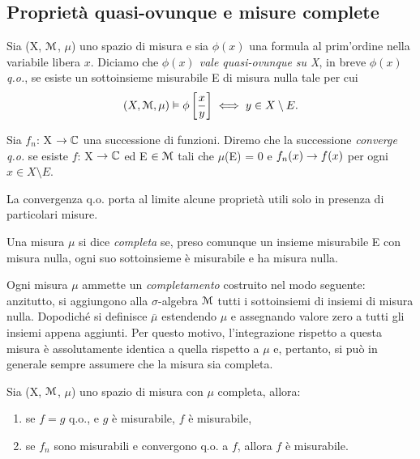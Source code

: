 \documentclass[Completo.tex]{subfiles}
\begin{document}
\subsection{Proprietà quasi-ovunque e misure complete}
Sia (X, $\eu[M]$, $\mu$) uno spazio di misura e sia $\phi(x)$ una formula al prim'ordine nella variabile libera $x$. Diciamo che \textit{$\phi(x)$ vale quasi-ovunque su X}, in breve \textit{$\phi(x)$ q.o.}, se esiste un sottoinsieme misurabile E di misura nulla tale per cui
\begin{equation*}
(X, \eu[M], \mu) \vDash \phi \left[\frac{x}{y}\right] \iff y \in X\setminus E.
\end{equation*}
\begin{Def}
	Sia $f_n$: X $\ra \bb[C]$ una successione di funzioni. Diremo che la successione \textit{converge q.o.} se esiste $f$: X $\ra \bb[C]$ ed E $\in \eu[M]$ tali che $\mu$(E) = 0 e $f_n(x) \rightarrow f(x)$ per ogni $x \in X\setminus E$.
\end{Def}
La convergenza q.o. porta al limite alcune proprietà utili solo in presenza di particolari misure.
\begin{Def}
	Una misura $\mu$ si dice \textit{completa} se, preso comunque un insieme misurabile E con misura nulla, ogni suo sottoinsieme è misurabile e ha misura nulla.
\end{Def}
\begin{Rem}
	Ogni misura $\mu$ ammette un \textit{completamento} costruito nel modo seguente: anzitutto, si aggiungono alla $\sigma$-algebra $\eu[M]$ tutti i sottoinsiemi di insiemi di misura nulla. Dopodiché si definisce $\overline{\mu}$ estendendo $\mu$ e assegnando valore zero a tutti gli insiemi appena aggiunti. Per questo motivo, l'integrazione rispetto a questa misura è assolutamente identica a quella rispetto a $\mu$ e, pertanto, si può in generale sempre assumere che la misura sia completa.
\end{Rem}
\begin{Prop}
	Sia (X, $\eu[M]$, $\mu$)  uno spazio di misura con $\mu$ completa, allora:
	\begin{enumerate}
		\item se $f = g$ q.o., e $g$ è misurabile, $f$ è misurabile,
		\item se $f_n$ sono misurabili e convergono q.o. a $f$, allora $f$ è misurabile.
	\end{enumerate}
\end{Prop}
\end{document}
